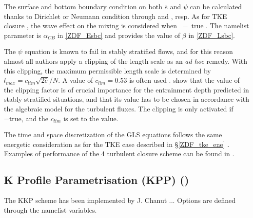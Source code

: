 \documentclass[NEMO_book]{subfiles}
\begin{document}
The surface and bottom boundary condition on both $\bar{e}$ and $\psi$ can be calculated 
thanks to Dirichlet or Neumann condition through  and , resp. 
As for TKE closure , the wave effect on the mixing is considered when ~=~true
\citep{Craig_Banner_JPO94, Mellor_Blumberg_JPO04}. The  namelist parameter 
is $\alpha_{CB}$ in \eqref{ZDF_Esbc} and  provides the value of $\beta$ in \eqref{ZDF_Lsbc}. 

The $\psi$ equation is known to fail in stably stratified flows, and for this reason 
almost all authors apply a clipping of the length scale as an \textit{ad hoc} remedy. 
With this clipping, the maximum permissible length scale is determined by 
$l_{max} = c_{lim} \sqrt{2\bar{e}}/ N$. A value of $c_{lim} = 0.53$ is often used 
\citep{Galperin_al_JAS88}. \cite{Umlauf_Burchard_CSR05} show that the value of 
the clipping factor is of crucial importance for the entrainment depth predicted in 
stably stratified situations, and that its value has to be chosen in accordance 
with the algebraic model for the turbulent fluxes. The clipping is only activated 
if =true, and the $c_{lim}$ is set to the  value.

The time and space discretization of the GLS equations follows the same energetic 
consideration as for the TKE case described in \S\ref{ZDF_tke_ene}  \citep{Burchard_OM02}. 
Examples of performance of the 4 turbulent closure scheme can be found in \citet{Warner_al_OM05}.

\subsection{K Profile Parametrisation (KPP) () }
\label{ZDF_kpp}


The KKP scheme has been implemented by J. Chanut ...
Options are defined through the   namelist variables.
\end{document}
